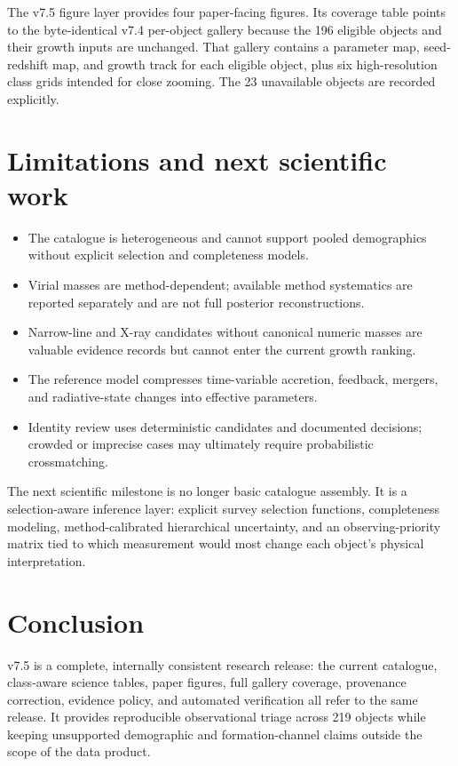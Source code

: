 \documentclass[11pt]{article}
\begin{document}
The v7.5 figure layer provides four paper-facing figures. Its coverage table
points to the byte-identical v7.4 per-object gallery because the 196 eligible
objects and their growth inputs are unchanged. That gallery contains a parameter
map, seed-redshift map, and growth track for each eligible object, plus six
high-resolution class grids intended for close zooming. The 23 unavailable
objects are recorded explicitly.

\section{Limitations and next scientific work}

\begin{itemize}
\item The catalogue is heterogeneous and cannot support pooled demographics
without explicit selection and completeness models.
\item Virial masses are method-dependent; available method systematics are
reported separately and are not full posterior reconstructions.
\item Narrow-line and X-ray candidates without canonical numeric masses are
valuable evidence records but cannot enter the current growth ranking.
\item The reference model compresses time-variable accretion, feedback, mergers,
and radiative-state changes into effective parameters.
\item Identity review uses deterministic candidates and documented decisions;
crowded or imprecise cases may ultimately require probabilistic crossmatching.
\end{itemize}

The next scientific milestone is no longer basic catalogue assembly. It is a
selection-aware inference layer: explicit survey selection functions,
completeness modeling, method-calibrated hierarchical uncertainty, and an
observing-priority matrix tied to which measurement would most change each
object's physical interpretation.

\section{Conclusion}

v7.5 is a complete, internally consistent research release: the current
catalogue, class-aware science tables, paper figures, full gallery coverage,
provenance correction, evidence policy, and automated verification all refer to
the same release. It provides reproducible observational triage across 219
objects while keeping unsupported demographic and formation-channel claims
outside the scope of the data product.
\end{document}
